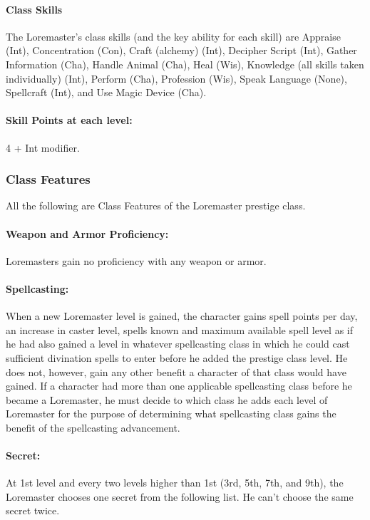 \paragraph{Class Skills}
The Loremaster's class skills (and the key ability for each skill) are Appraise (Int), Concentration (Con), Craft (alchemy) (Int), Decipher Script (Int), Gather Information (Cha), Handle Animal (Cha), Heal (Wis), Knowledge (all skills taken individually) (Int), Perform (Cha), Profession (Wis), Speak Language (None), Spellcraft (Int), and Use Magic Device (Cha).
\paragraph{Skill Points at each level:} 4 + Int modifier.
\subsubsection{Class Features}
All the following are Class Features of the Loremaster prestige class.

\paragraph{Weapon and Armor Proficiency:} Loremasters gain no proficiency with any weapon or armor.

\paragraph{Spellcasting:} When a new Loremaster level is gained, the character gains spell points per day, an increase in caster level, spells known and maximum available spell level as if he had also gained a level in whatever spellcasting class in which he could cast sufficient divination spells to enter before he added the prestige class level. 
He does not, however, gain any other benefit a character of that class would have gained. 
If a character had more than one applicable spellcasting class before he became a Loremaster, 
he must decide to which class he adds each level of Loremaster for the purpose of determining what spellcasting class gains the benefit of the spellcasting advancement.

\paragraph{Secret:}
At 1st level and every two levels higher than 1st (3rd, 5th, 7th, and 9th), the Loremaster chooses one secret from the following list.
He can't choose the same secret twice.

